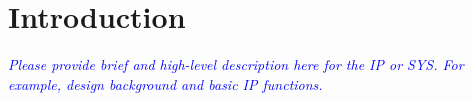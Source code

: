 
\clearpage

\section{Introduction} 
\noindent\textit{\small\textcolor{blue}{Please provide brief and high-level description here for the IP or SYS. For example, design background and basic IP functions.}}